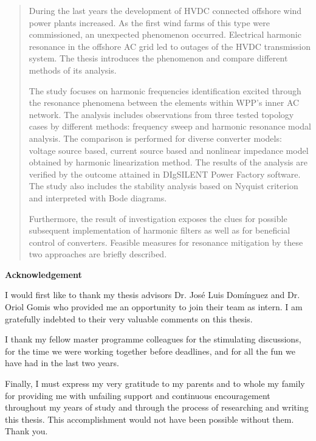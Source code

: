 \documentclass[a4paper,11pt,twoside,openright]{report}
\begin{document}



\begin{abstract}
During the last years the development of HVDC connected offshore wind power plants increased. As the first wind farms of this type were commissioned, an unexpected phenomenon occurred. Electrical harmonic resonance in the offshore AC grid led to outages of the HVDC transmission system. The thesis introduces the phenomenon and compare different methods of its analysis.

The study focuses on harmonic frequencies identification excited through the resonance phenomena between the elements within WPP's inner AC network. The analysis includes observations from three tested topology cases by different methods: frequency sweep and harmonic resonance modal analysis. The comparison is performed for diverse converter models: voltage source based, current source based and nonlinear impedance model obtained by harmonic linearization method. The results of the analysis are verified by the outcome attained in DIgSILENT Power Factory software. The study also includes the stability analysis based on Nyquist criterion and interpreted with Bode diagrams.

Furthermore, the result of investigation exposes the clues for possible subsequent implementation of harmonic filters as well as for beneficial control of converters. Feasible measures for resonance mitigation by these two approaches are briefly described.
\end{abstract}
\newpage

\vspace*{0cm}
        
\begin{center}
\textbf{{\LARGE Acknowledgement}}
\end{center}

\begin{changemargin}{1.5cm}{1.5cm} 
I would first like to thank my thesis advisors Dr. Jos\'{e} Luis Dom\'{i}nguez and Dr. Oriol Gomis who provided me an opportunity to join their team as intern. I am gratefully indebted to their very valuable comments on this thesis.

I thank my fellow master programme colleagues for the stimulating discussions, for the time we were working together before deadlines, and for all the fun we have had in the last two years.

Finally, I must express my very gratitude to my parents and to whole my family for providing me with unfailing support and continuous encouragement throughout my years of study and through the process of researching and writing this thesis. This accomplishment would not have been possible without them. Thank you.
\end{changemargin}
\end{document}
